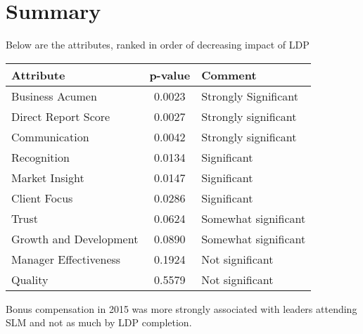 \documentclass[11pt]{extarticle} %
\begin{document}
\section*{Summary}
Below are the attributes, ranked in order of decreasing impact of LDP
\begin{table}[H]
\centering
\begin{tabular}{l|c|l}
\hline
\hline
Attribute & p-value & Comment \\
\hline
Business Acumen 	& 0.0023 & Strongly Significant \\
Direct Report Score 	& 0.0027 & Strongly significant \\
Communication 		& 0.0042 & Strongly significant \\
Recognition 		& 0.0134 & Significant \\
Market Insight 		& 0.0147 & Significant \\
Client Focus 		& 0.0286 & Significant \\
Trust 			& 0.0624 & Somewhat significant \\
Growth and Development 	& 0.0890 & Somewhat significant \\
Manager Effectiveness 	& 0.1924 & Not significant \\
Quality 		& 0.5579 & Not significant \\
\hline
\hline
\end{tabular}
\end{table}

Bonus compensation in 2015 was more strongly associated with leaders attending SLM and not as much by LDP completion.
\end{document}
